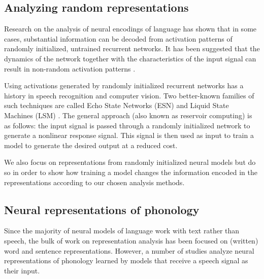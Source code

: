 \subsection{Analyzing random representations}

Research on the analysis of neural encodings of language has shown that in some cases, 
substantial information can be decoded from activation patterns of randomly initialized, untrained 
recurrent networks. It has been suggested that the dynamics of the network together with the characteristics
of the input signal can result in non-random activation patterns \citep{DBLP:journals/corr/abs-1809-10040}. 

Using activations generated by randomly initialized recurrent networks has a history in speech recognition and 
computer vision. Two better-known families of such techniques are called Echo State Networks (ESN) 
\citep{jaeger2001echo} and Liquid State Machines (LSM) \citep{maass2002real}. The general approach 
(also known as reservoir computing) is as follows: the input signal is passed through a randomly 
initialized network to generate a nonlinear response signal. This signal is then used as input to train a model 
to generate the desired output at a reduced cost.


We also focus on representations from randomly initialized neural
models but do so in order to show how training a model changes the
information encoded in the representations according to our chosen
analysis methods.


\subsection{Neural representations of phonology}

Since the majority of neural models of language work with text rather than speech, the bulk of work on 
representation analysis has been focused on (written) word and sentence representations. However, a number
of studies analyze neural representations of phonology learned by models that receive a speech signal as their 
input. 


